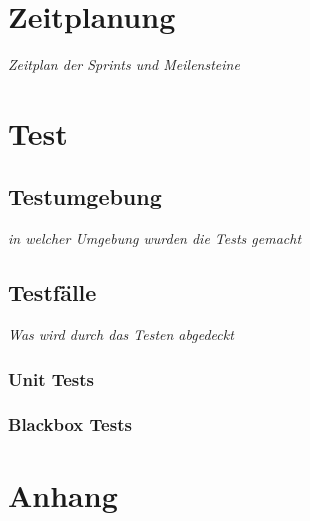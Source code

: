 \documentclass[a4paper, 10pt, fleqn]{article}
\begin{document}
	\section{Zeitplanung}
		\textit{Zeitplan der Sprints und Meilensteine}
	\section{Test}
		\subsection{Testumgebung}
			\textit{in welcher Umgebung wurden die Tests gemacht}
		\subsection{Testfälle}
			\textit{Was wird durch das Testen abgedeckt}
			\subsubsection{Unit Tests}
			\subsubsection{Blackbox Tests}

\clearpage
\thispagestyle{empty}
	\section*{Anhang}
\end{document}
